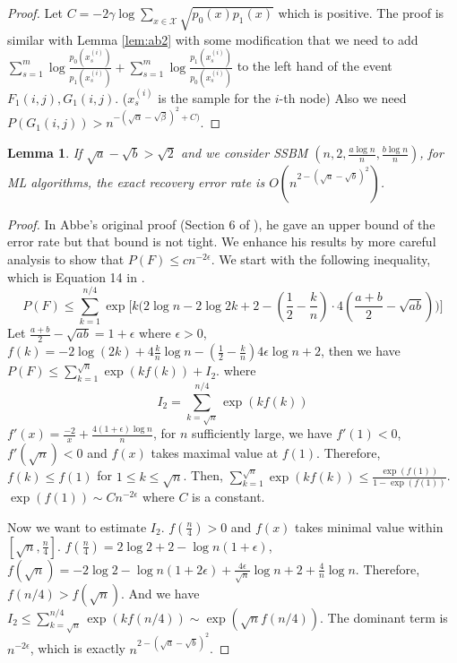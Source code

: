 \documentclass{article}
\newtheorem{lemma}{Lemma}
\begin{document}
\begin{proof}
	Let $C = - 2\gamma\log\sum_{x\in\mathcal{X}} \sqrt{p_0(x)p_1(x)}$ which is positive.
	The proof is similar with Lemma \ref{lem:ab2} with some modification that we need to add $\sum_{s=1}^m \log \frac{p_0(x^{(i)}_s)}{p_1(x_s^{(i)})}
	+ \sum_{s=1}^m \log \frac{p_1(x^{(i)}_s)}{p_0(x_s^{(i)})}$ to the left hand of the event $F_1(i,j), G_1(i,j)$. ($x_s^{(i)}$ is the sample for the $i$-th node)
	Also we need
	$P(G_1(i,j)) > n^{-(\sqrt{\alpha} - \sqrt{\beta})^2 + C)}$.
\end{proof}
\begin{lemma}
	If $\sqrt{a} - \sqrt{b} > \sqrt{2}$ and we consider SSBM $(n,2, \frac{a\log n}{n}, \frac{b \log n}{n})$, for ML algorithms, the exact recovery error rate is $O( n^{2-(\sqrt{a} - \sqrt{b})^2})$.
\end{lemma}
\begin{proof}
	In Abbe's original proof (Section 6 of \cite{abbe}), he gave an upper bound of the error rate but that bound is not tight.
	We enhance his results by more careful analysis to show that $P(F) \leq cn^{-2\epsilon}$.
	We start with the following inequality, which is Equation 14 in \cite{abbe}.
	\begin{equation}
	P(F) \leq \sum_{k=1}^{n/4} \exp \Big[k\Big( 2\log n - 2 \log 2k + 2 - (\frac{1}{2} - \frac{k}{n})\cdot 4(\frac{a+b}{2} - \sqrt{ab})  \Big)\Big]
	\end{equation}
	Let $\frac{a+b}{2} - \sqrt{ab} = 1 + \epsilon$ where $\epsilon > 0$, $f(k) = -2\log(2k) + 4\frac{k}{n} \log n - (\frac{1}{2} - \frac{k}{n}) 4\epsilon \log n + 2$,
	then we have
	$P(F)\leq \sum_{k=1}^{\sqrt{n}} \exp(kf(k)) + I_2$. where
	\begin{equation}
	I_2 = \sum_{k=\sqrt{n}}^{n/4}\exp(kf(k))
	\end{equation}
	$f'(x) = \frac{-2}{x} + \frac{4(1+\epsilon)\log n}{n}$, for $n$ sufficiently large, we have $f'(1) < 0$, $f'(\sqrt{n})<0$ and $f(x)$ takes maximal value
	at $f(1)$. Therefore, $f(k)\leq f(1)$ for $1\leq k \leq \sqrt{n}$. Then,
	$\sum_{k=1}^{\sqrt{n}} \exp(kf(k)) \leq \frac{\exp(f(1))}{1-\exp(f(1))}$. $\exp(f(1))\sim C n^{-2\epsilon}$ where $C$ is a constant.
	
	Now we want to estimate $I_2$. $f(\frac{n}{4}) > 0$ and $f(x)$ takes minimal value within $[\sqrt{n}, \frac{n}{4}]$.
	$f(\frac{n}{4}) = 2\log 2 + 2 - \log n (1+\epsilon)$, $f(\sqrt{n}) = -2\log 2 - \log n(1+2\epsilon) + \frac{4\epsilon}{\sqrt{n}}\log n + 2 + \frac{4}{n}\log n $.
	Therefore, $f(n/4) > f(\sqrt{n})$. And we have $I_2 \leq \sum_{k=\sqrt{n}}^{n/4} \exp(kf(n/4)) \sim \exp(\sqrt{n}f(n/4))$.
	The dominant term is $n^{-2\epsilon}$, which is exactly $n^{2-(\sqrt{a} - \sqrt{b})^2}$.
	

\end{proof}
\end{document}
